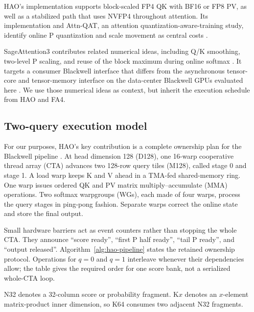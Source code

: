 HAO's implementation supports block-scaled FP4 QK with BF16 or FP8 PV, as
well as a stabilized path that uses NVFP4 throughout attention.  Its
implementation and Attn-QAT, an attention quantization-aware-training study,
identify online P quantization and scale movement as central costs
\cite{hao2026fp4flashattention,zhang2026attnqat}.

SageAttention3 contributes related numerical ideas, including Q/K smoothing,
two-level P scaling, and reuse of the block maximum during online softmax
\cite{zhang2025sageattention3}.  It targets a consumer Blackwell interface
that differs from the asynchronous tensor-core and tensor-memory interface on
the data-center Blackwell GPUs evaluated here \cite{nvidia2026ptx}.  We use
those numerical ideas as context, but inherit the execution schedule from HAO
and FA4.

\subsection{Two-query execution model}

For our purposes, HAO's key contribution is a complete ownership plan for the
Blackwell pipeline \cite{hao2026fp4flashattention}.  At head dimension 128
(D128), one 16-warp cooperative thread array (CTA) advances two 128-row query
tiles (M128), called stage 0 and stage 1.  A load warp keeps K and V ahead in a
TMA-fed shared-memory ring.  One warp issues ordered QK and PV matrix
multiply--accumulate (MMA) operations.  Two softmax warpgroups (WGs), each
made of four warps, process the query stages in ping-pong fashion.  Separate
warps correct the online state and store the final output.

Small hardware barriers act as event counters rather than stopping the whole
CTA.  They announce ``score ready'', ``first P half ready'', ``tail P ready'',
and ``output released''.  Algorithm~\ref{alg:hao-pipeline} states the retained
ownership protocol.  Operations for $q=0$ and $q=1$ interleave whenever their
dependencies allow; the table gives the required order for one score bank,
not a serialized whole-CTA loop.

N32 denotes a 32-column score or probability fragment.  K$x$ denotes an
$x$-element matrix-product inner dimension, so K64 consumes two adjacent N32
fragments.

